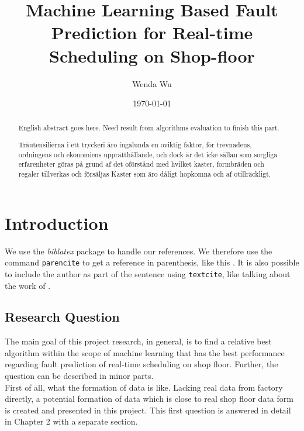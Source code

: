 \documentclass{kththesis}
\title{Machine Learning Based Fault Prediction for Real-time Scheduling on Shop-floor}
\author{Wenda Wu}
\date{\today}
\begin{document}
\frontmatter

\titlepage

\begin{abstract}
  English abstract goes here. Need result from algorithms evaluation to finish this part.

\end{abstract}


\begin{otherlanguage}{swedish}
  \begin{abstract}
    Träutensilierna i ett tryckeri äro ingalunda en oviktig faktor,
    för trevnadens, ordningens och ekonomiens upprätthållande, och
    dock är det icke sällan som sorgliga erfarenheter göras på grund
    af det oförstånd med hvilket kaster, formbräden och regaler
    tillverkas och försäljas Kaster som äro dåligt hopkomna och af
    otillräckligt.
  \end{abstract}
\end{otherlanguage}


\tableofcontents


\mainmatter


\chapter{Introduction}

We use the \emph{biblatex} package to handle our references.  We therefore use the
command \texttt{parencite} to get a reference in parenthesis, like this
\parencite{heisenberg2015}.  It is also possible to include the author
as part of the sentence using \texttt{textcite}, like talking about
the work of \textcite{einstein2016}.


\section{Research Question}

The main goal of this project research, in general, is to find a relative best algorithm within the scope of machine learning that has the best performance regarding fault prediction of real-time scheduling on shop floor. Further, the question can be described in minor parts. \\

First of all, what the formation of data is like. Lacking real data from factory directly, a potential formation of data which is close to real shop floor data form is created and presented in this project. This first question is answered in detail in Chapter 2 with a separate section.\\
\end{document}

